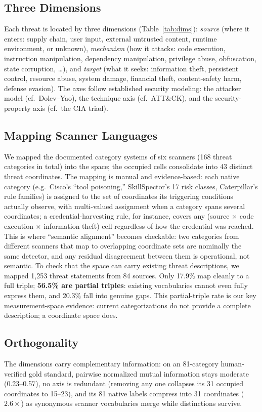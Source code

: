 \documentclass[sigconf,nonacm]{acmart}
\begin{document}
\subsection{Three Dimensions}
Each threat is located by three dimensions (Table~\ref{tab:dims}): \emph{source} (where it enters: supply chain, user input, external untrusted content, runtime environment, or unknown), \emph{mechanism} (how it attacks: code execution, instruction manipulation, dependency manipulation, privilege abuse, obfuscation, state corruption, \ldots), and \emph{target} (what it seeks: information theft, persistent control, resource abuse, system damage, financial theft, content-safety harm, defense evasion). The axes follow established security modeling: the attacker model (cf.\ Dolev--Yao), the technique axis (cf.\ ATT\&CK), and the security-property axis (cf.\ the CIA triad).

\subsection{Mapping Scanner Languages}
We mapped the documented category systems of six scanners (168 threat categories in total) into the space; the occupied cells consolidate into 43 distinct threat coordinates. The mapping is manual and evidence-based: each native category (e.g.\ Cisco's ``tool poisoning,'' SkillSpector's 17 risk classes, Caterpillar's rule families) is assigned to the set of coordinates its triggering conditions actually observe, with multi-valued assignment when a category spans several coordinates; a credential-harvesting rule, for instance, covers any (source $\times$ code execution $\times$ information theft) cell regardless of how the credential was reached. This is where ``semantic alignment'' becomes checkable: two categories from different scanners that map to overlapping coordinate sets are nominally the same detector, and any residual disagreement between them is operational, not semantic. To check that the space can carry existing threat descriptions, we mapped 1{,}253 threat statements from 84 sources. Only 17.9\% map cleanly to a full triple; \textbf{56.5\% are partial triples}: existing vocabularies cannot even fully express them, and 20.3\% fall into genuine gaps. This partial-triple rate is our key measurement-space evidence: current categorizations do not provide a complete description; a coordinate space does.

\subsection{Orthogonality}
The dimensions carry complementary information: on an 81-category human-verified gold standard, pairwise normalized mutual information stays moderate (0.23--0.57), no axis is redundant (removing any one collapses its 31 occupied coordinates to 15--23), and its 81 native labels compress into 31 coordinates ($2.6\times$) as synonymous scanner vocabularies merge while distinctions survive.
\end{document}
